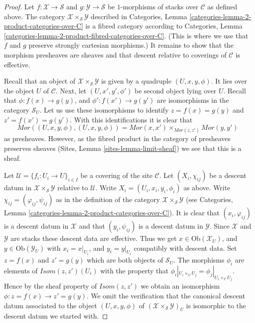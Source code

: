 \begin{proof}
Let $f : \mathcal{X} \to \mathcal{S}$ and
$g : \mathcal{Y} \to \mathcal{S}$ be
$1$-morphisms of stacks over $\mathcal{C}$
as defined above. The category
$\mathcal{X} \times_{\mathcal{S}} \mathcal{Y}$
described in
Categories, Lemma \ref{categories-lemma-2-product-categories-over-C} is a
fibred category according to
Categories, Lemma \ref{categories-lemma-2-product-fibred-categories-over-C}.
(This is where we use that $f$ and $g$ preserve strongly cartesian
morphisms.) It remains to show that the morphism presheaves are sheaves
and that descent relative to coverings of $\mathcal{C}$ is effective.

\medskip\noindent
Recall that an object of $\mathcal{X} \times_{\mathcal{S}} \mathcal{Y}$
is given by a quadruple $(U, x, y, \phi)$.
It lies over the object
$U$ of $\mathcal{C}$. Next, let $(U, x', y', \phi')$ be second
object lying over $U$.
Recall that $\phi : f(x) \to g(y)$, and $\phi' : f(x') \to g(y')$
are isomorphisms in the category $\mathcal{S}_U$. Let us
use these isomorphisms to identify $z = f(x) = g(y)$ and
$z' = f(x') = g(y')$. With this identifications
it is clear that
$$
\mathit{Mor}((U, x, y, \phi), (U, x, y, \phi))
=
\mathit{Mor}(x, x')
\times_{\mathit{Mor}(z, z')}
\mathit{Mor}(y, y')
$$
as presheaves. However, as the fibred product in the category of
presheaves preserves sheaves (Sites, Lemma \ref{sites-lemma-limit-sheaf})
we see that this is a sheaf.

\medskip\noindent
Let $\mathcal{U} = \{f_i : U_i \to U\}_{i \in I}$ be a covering of the site
$\mathcal{C}$. Let $(X_i, \chi_{ij})$ be a descent datum
in $\mathcal{X} \times_{\mathcal{S}} \mathcal{Y}$ relative to $\mathcal{U}$.
Write $X_i = (U_i, x_i, y_i, \phi_i)$ as above. Write
$\chi_{ij} = (\varphi_{ij}, \psi_{ij})$ as in the definition of
the category $\mathcal{X} \times_{\mathcal{S}} \mathcal{Y}$ (see
Categories, Lemma \ref{categories-lemma-2-product-categories-over-C}).
It is clear that $(x_i, \varphi_{ij})$ is a descent datum in
$\mathcal{X}$ and that $(y_i, \psi_{ij})$ is a descent datum in 
$\mathcal{Y}$. Since $\mathcal{X}$ and $\mathcal{Y}$ are stacks these
descent data are effective. Thus we get
$x \in \text{Ob}(\mathcal{X}_U)$, and $y \in \text{Ob}(\mathcal{Y}_U)$
with $x_i = x|_{U_i}$, and $y_i = y|_{U_i}$ compatibly with descent data.
Set $z = f(x)$ and $z' = g(y)$ which are both objects of $\mathcal{S}_U$.
The morphisms $\phi_i$ are elements of
$\mathit{Isom}(z, z')(U_i)$ with the property that
$\phi_i|_{U_i \times_U U_j} = \phi_j|_{U_i \times_U U_j}$.
Hence by the sheaf property of $\mathit{Isom}(z, z')$
we obtain an isomorphism $\phi : z = f(x) \to z' = g(y)$.
We omit the verification that the canonical descent datum associated to
the object $(U, x, y, \phi)$ of
$(\mathcal{X} \times_{\mathcal{S}} \mathcal{Y})_U$ is isomorphic
to the descent datum we started with.
\end{proof}











